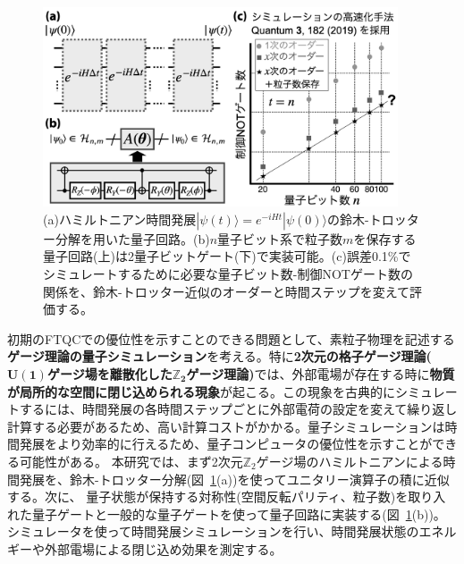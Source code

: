 \documentclass[11pt,a4j,dvipdfmx]{jarticle} 					%
\newcommand{\研究課題名}{誤り耐性量子コンピュータに向けた誤り訂正技術の開発(仮)}
\newcommand{\研究機関名}{東京大学}
\newcommand{\研究代表者氏名}{寺師弘二}
\newcommand{\研究期間の最終元号年度}{10}  %
\newcommand{\mybf}[1]{{\bfseries\sffamily#1}}
\begin{document}
\begin{figure}
	\begin{center}
		\vspace{-1.4cm}
		\includegraphics[width=10.5cm]{figs/trotter.png}\vspace{-0.4cm}
		\caption{\small{(a)ハミルトニアン時間発展$|\psi(t)\rangle=e^{-iHt}|\psi(0)\rangle$の鈴木-トロッター分解を用いた量子回路。(b)$n$量子ビット系で粒子数$m$を保存する量子回路(上)は2量子ビットゲート(下)で実装可能。(c)誤差0.1\%でシミュレートするために必要な量子ビット数-制御NOTゲート数の関係を、鈴木-トロッター近似のオーダーと時間ステップを変えて評価する。}
		\label{fig:z2}}\vspace{-0.7cm}
	\end{center}
\end{figure}

初期のFTQCでの優位性を示すことのできる問題として、素粒子物理を記述する\mybf{ゲージ理論の量子シミュレーション}を考える。特に\mybf{2次元の格子ゲージ理論($\pmb{U(1)}$ゲージ場を離散化した$\pmb{\mathbb{Z}_2}$ゲージ理論)}では、外部電場が存在する時に\mybf{物質が局所的な空間に閉じ込められる現象}が起こる。この現象を古典的にシミュレートするには、時間発展の各時間ステップごとに外部電荷の設定を変えて繰り返し計算する必要があるため、高い計算コストがかかる。量子シミュレーションは時間発展をより効率的に行えるため、量子コンピュータの優位性を示すことができる可能性がある。
本研究では、まず2次元$\mathbb{Z}_2$ゲージ場のハミルトニアンによる時間発展を、鈴木-トロッター分解(図~\ref{fig:z2}(a))を使ってユニタリー演算子の積に近似する。次に、
量子状態が保持する対称性(空間反転パリティ、粒子数)を取り入れた量子ゲートと一般的な量子ゲートを使って量子回路に実装する(図~\ref{fig:z2}(b))。
シミュレータを使って時間発展シミュレーションを行い、時間発展状態のエネルギーや外部電場による閉じ込め効果を測定する。\vspace{-4mm}\\
\end{document}
